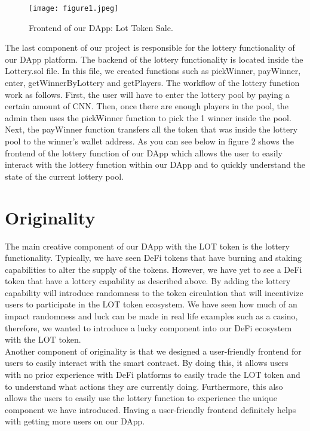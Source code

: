 \documentclass[11pt]{article}
\begin{document}
\begin{figure*}[!t]
\centering
\texttt{[image: figure1.jpeg]}
\caption{Frontend of our DApp: Lot Token Sale.}
\label{fig:fig1}
\end{figure*}

The last component of our project is responsible for the lottery functionality of our DApp platform. The backend of the lottery functionality is located inside the Lottery.sol file. In this file, we created functions such as pickWinner, payWinner, enter, getWinnerByLottery and getPlayers. The workflow of the lottery function work as follows. First, the user will have to enter the lottery pool by paying a certain amount of CNN. Then, once there are enough players in the pool, the admin then uses the pickWinner function to pick the 1 winner inside the pool. Next, the payWinner function transfers all the token that was inside the lottery pool to the winner’s wallet address. As you can see below in figure 2 shows the frontend of the lottery function of our DApp which allows the user to easily interact with the lottery function within our DApp and to quickly understand the state of the current lottery pool.\\
\section*{Originality}
The main creative component of our DApp with the LOT token is the lottery functionality. Typically, we have seen DeFi tokens that have burning and staking capabilities to alter the supply of the tokens. However, we have yet to see a DeFi token that have a lottery capability as described above. By adding the lottery capability will introduce randomness to the token circulation that will incentivize users to participate in the LOT token ecosystem. We have seen how much of an impact randomness and luck can be made in real life examples such as a casino, therefore, we wanted to introduce a lucky component into our DeFi ecosystem with the LOT token. \\
Another component of originality is that we designed a user-friendly frontend for users to easily interact with the smart contract. By doing this, it allows users with no prior experience with DeFi platforms to easily trade the LOT token and to understand what actions they are currently doing. Furthermore, this also allows the users to easily use the lottery function to experience the unique component we have introduced. Having a user-friendly frontend definitely helps with getting more users on our DApp.\\
\end{document}
